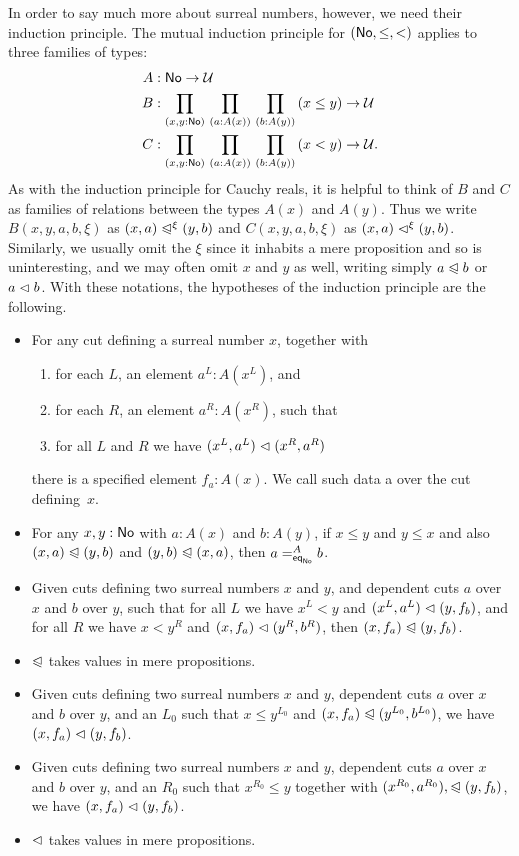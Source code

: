 In order to say much more about surreal numbers, however, we need their induction principle.
The mutual induction principle for $(\NO,\le,<)$ applies to three families of types:
\begin{align*}
  A &: \NO\to\type\\
  B &: \prd{x,y:\NO}{a:A(x)}{b:A(y)} (x\le y) \to \type\\
  C &: \prd{x,y:\NO}{a:A(x)}{b:A(y)} (x<y) \to \type.
\end{align*}
As with the induction principle for Cauchy reals, it is helpful to think of $B$ and $C$ as families of relations between the types $A(x)$ and $A(y)$.
Thus we write $B(x,y,a,b,\xi)$ as $(x,a) \ble^\xi (y,b)$ and $C(x,y,a,b,\xi)$ as $(x,a) \blt^\xi (y,b)$.
Similarly, we usually omit the $\xi$ since it inhabits a mere proposition and so is uninteresting, and we may often omit $x$ and $y$ as well, writing simply $a\ble b$ or $a\blt b$.
With these notations, the hypotheses of the induction principle are the following.
\begin{itemize}
\item For any cut defining a surreal number $x$, together with
  \begin{enumerate}
  \item for each $L$, an element $a^L:A(x^L)$, and
  \item for each $R$, an element $a^R:A(x^R)$, such that
  \item for all $L$ and $R$ we have $(x^L,a^L) \blt (x^R,a^R)$
  \end{enumerate}
  there is a specified element $f_a:A(x)$.
  We call such data a 
  over the cut defining~$x$.
\item For any $x,y:\NO$ with $a:A(x)$ and $b:A(y)$, if $x\le y$ and $y\le x$ and also $(x,a) \ble (y,b)$
  and $(y,b) \ble (x,a)$,
  then $\dpath{A}{\noeq}{a}{b}$.
\item Given cuts defining two surreal numbers $x$ and $y$, and dependent cuts $a$ over $x$ and $b$ over $y$, such that for all $L$ we have $x^L<y$ and $(x^L,a^L)\blt (y,f_b)$,
  and for all $R$ we have $x<y^R$ and $(x,f_a) \blt (y^R,b^R)$,
  then $(x,f_a) \ble (y,f_b)$.
\item $\ble$ takes values in mere propositions.
\item Given cuts defining two surreal numbers $x$ and $y$, dependent cuts $a$ over $x$ and $b$ over $y$, and an $L_0$ such that $x\le y^{L_0}$ and $(x,f_a) \ble (y^{L_0},b^{L_0})$,
  we have $(x,f_a) \blt (y,f_b)$.
\item Given cuts defining two surreal numbers $x$ and $y$, dependent cuts $a$ over $x$ and $b$ over $y$, and an ${R_0}$ such that $x^{R_0}\le y$ together with $(x^{R_0},a^{R_0}),\ble (y,f_b)$,
  we have $(x,f_a) \blt (y,f_b)$.
\item $\blt$ takes values in mere propositions.
\end{itemize}

